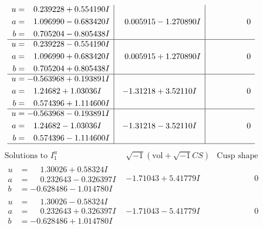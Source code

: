 \documentclass[1p]{elsarticle_modified}
\theoremstyle{definition}
\newcommand{\I}{\sqrt{-1}}
\begin{document}
$$\begin{array}{c|c|c}
\begin{aligned}
u &= \phantom{-}0.239228 + 0.554190 I \\
a &= \phantom{-}1.096990 - 0.683420 I \\
b &= \phantom{-}0.705204 - 0.805438 I\end{aligned}
 & \phantom{-}0.005915 - 1.270890 I & \phantom{-0.000000 } 0 \\ \hline\begin{aligned}
u &= \phantom{-}0.239228 - 0.554190 I \\
a &= \phantom{-}1.096990 + 0.683420 I \\
b &= \phantom{-}0.705204 + 0.805438 I\end{aligned}
 & \phantom{-}0.005915 + 1.270890 I & \phantom{-0.000000 } 0 \\ \hline\begin{aligned}
u &= -0.563968 + 0.193891 I \\
a &= \phantom{-}1.24682 + 1.03036 I \\
b &= \phantom{-}0.574396 + 1.114600 I\end{aligned}
 & -1.31218 + 3.52110 I & \phantom{-0.000000 } 0 \\ \hline\begin{aligned}
u &= -0.563968 - 0.193891 I \\
a &= \phantom{-}1.24682 - 1.03036 I \\
b &= \phantom{-}0.574396 - 1.114600 I\end{aligned}
 & -1.31218 - 3.52110 I & \phantom{-0.000000 } 0\\
 \hline 
 \end{array}$$\newpage$$\begin{array}{c|c|c}  
\text{Solutions to }I^u_{1}& \I (\text{vol} + \sqrt{-1}CS) & \text{Cusp shape}\\
 \hline 
\begin{aligned}
u &= \phantom{-}1.30026 + 0.58324 I \\
a &= \phantom{-}0.232643 - 0.326397 I \\
b &= -0.628486 - 1.014780 I\end{aligned}
 & -1.71043 + 5.41779 I & \phantom{-0.000000 } 0 \\ \hline\begin{aligned}
u &= \phantom{-}1.30026 - 0.58324 I \\
a &= \phantom{-}0.232643 + 0.326397 I \\
b &= -0.628486 + 1.014780 I\end{aligned}
 & -1.71043 - 5.41779 I & \phantom{-0.000000 } 0 \\ \hline\begin{aligned}

\end{aligned}
\end{array}$$
\end{document}
